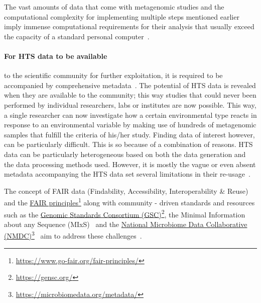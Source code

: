       The vast amounts of data that come with metagenomic studies and the computational complexity for implementing multiple steps mentioned earlier imply immense computational requirements for their analysis that usually exceed the capacity of a standard personal computer~\cite{merelli2014managing}. 

      \paragraph{For HTS data to be available }
      to the scientific community for further exploitation,
      it is required to be accompanied by
      comprehensive metadata~\cite{vangay2021microbiome}. 
      The potential of HTS data is revealed when they are available to the community; 
      this way studies that could never been performed
      by individual researchers, labs or institutes are now possible. 
      This way, 
      a single researcher can now investigate
      how a certain environmental type reacts in response to an environmental 
      variable by making use of hundreds of metagenomic samples 
      that fulfill the criteria of his/her study.
      Finding data of interest however, can be particularly difficult.
      This is so because of a combination of reasons.
      HTS data can be particularly heterogeneous based on both the data generation and the data processing methods used. 
      However, it is mostly the vague or even absent metadata accompanying the HTS data set several limitations in their re-usage~\cite{hu2022challenges}. 

      The concept of FAIR data (Findability, Accessibility, Interoperability \& Reuse)
      and the \href{https://www.go-fair.org/fair-principles/}{FAIR principles}\footnote{\href{https://www.go-fair.org/fair-principles/}{https://www.go-fair.org/fair-principles/}}
      along with community - driven standards and resources such as 
      the \href{https://gensc.org/}{Genomic Standards Consortium (GSC)}\footnote{\href{https://gensc.org/}{https://gensc.org/}},
      the Minimal Information about any Sequence (MIxS)~\cite{yilmaz2011minimum, yilmaz2011genomic}
      and the \href{https://microbiomedata.org/metadata/}{National Microbiome Data Collaborative (NMDC)}\footnote{\href{https://microbiomedata.org/metadata/}{https://microbiomedata.org/metadata/}}~\cite{wood2020national}
      aim to address these challenges~\cite{wilkinson2016fair}.
